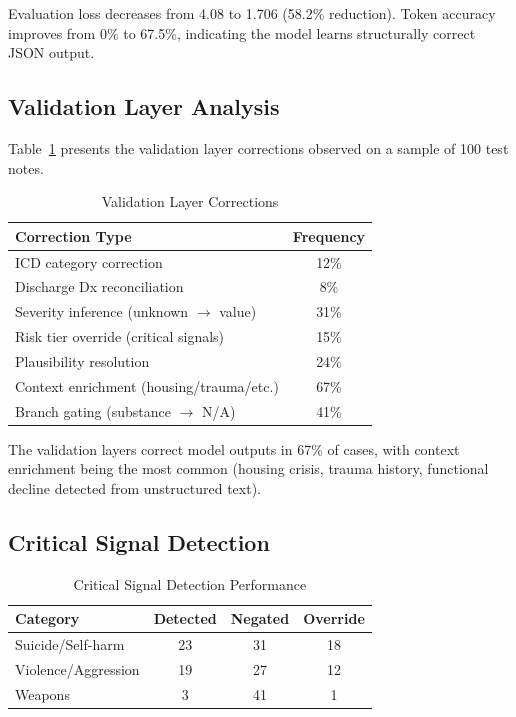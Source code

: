 \documentclass[conference]{IEEEtran}
\begin{document}
Evaluation loss decreases from 4.08 to 1.706 (58.2\% reduction). Token accuracy improves from 0\% to 67.5\%, indicating the model learns structurally correct JSON output.

\subsection{Validation Layer Analysis}

Table~\ref{tab:validation} presents the validation layer corrections observed on a sample of 100 test notes.

\begin{table}[t]
\caption{Validation Layer Corrections}
\label{tab:validation}
\centering
\begin{tabular}{lc}
\hline
\textbf{Correction Type} & \textbf{Frequency} \\
\hline
ICD category correction & 12\% \\
Discharge Dx reconciliation & 8\% \\
Severity inference (unknown $\rightarrow$ value) & 31\% \\
Risk tier override (critical signals) & 15\% \\
Plausibility resolution & 24\% \\
Context enrichment (housing/trauma/etc.) & 67\% \\
Branch gating (substance $\rightarrow$ N/A) & 41\% \\
\hline
\end{tabular}
\end{table}

The validation layers correct model outputs in 67\% of cases, with context enrichment being the most common (housing crisis, trauma history, functional decline detected from unstructured text).

\subsection{Critical Signal Detection}

\begin{table}[t]
\caption{Critical Signal Detection Performance}
\label{tab:signals}
\centering
\begin{tabular}{lccc}
\hline
\textbf{Category} & \textbf{Detected} & \textbf{Negated} & \textbf{Override} \\
\hline
Suicide/Self-harm & 23 & 31 & 18 \\
Violence/Aggression & 19 & 27 & 12 \\
Weapons & 3 & 41 & 1 \\
\hline
\end{tabular}
\end{table}
\end{document}
